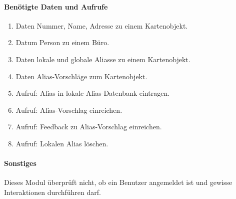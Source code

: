 \paragraph{Benötigte Daten und Aufrufe}
\begin{enumerate}
    \item Daten Nummer, Name, Adresse zu einem Kartenobjekt.
    \item Datum Person zu einem Büro.
    \item Daten lokale und globale Aliasse zu einem Kartenobjekt.
    \item Daten Alias-Vorschläge zum Kartenobjekt.
    \item Aufruf: Alias in lokale Alias-Datenbank eintragen.
    \item Aufruf: Alias-Vorschlag einreichen.
    \item Aufruf: Feedback zu Alias-Vorschlag einreichen.
    \item Aufruf: Lokalen Alias löschen.
\end{enumerate}
\paragraph{Sonstiges}
Dieses Modul überprüft nicht, ob ein Benutzer angemeldet ist und gewisse Interaktionen durchführen darf.